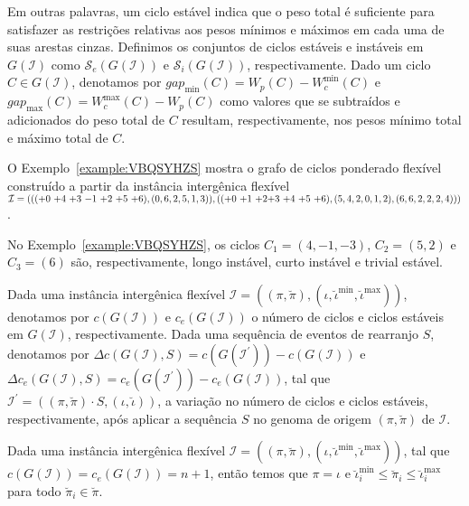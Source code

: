 Em outras palavras, um ciclo estável indica que o peso total é suficiente para satisfazer as restrições relativas aos pesos mínimos e máximos em cada uma de suas arestas cinzas. Definimos os conjuntos de ciclos estáveis e instáveis em $G(\mathcal{I})$ como $\mathcal{S}_e(G(\mathcal{I}))$ e $\mathcal{S}_i(G(\mathcal{I}))$, respectivamente. Dado um ciclo $C \in G(\mathcal{I})$, denotamos por $gap_{\min}(C) = W_p(C) - W^{\min}_c(C)$ e $gap_{\max}(C) = W^{\max}_c(C) - W_p(C)$ como valores que se subtraídos e adicionados do peso total de $C$ resultam, respectivamente, nos pesos mínimo total e máximo total de $C$.

O Exemplo~\ref{example:VBQSYHZS} mostra o grafo de ciclos ponderado flexível construído a partir da instância intergênica flexível $\mathcal{I} = ((({+0}~{+4}~{+3}~{-1}~{+2}~{+5}~{+6}),(0,6,2,5,1,3)),(({+0}~{+1}~{+2}\break{+3}~{+4}~{+5}~{+6}),(5,4,2,0,1,2),(6,6,2,2,2,4)))$.



No Exemplo~\ref{example:VBQSYHZS}, os ciclos $C_1=(4,-1,-3)$, $C_2 = (5,2)$ e $C_3 = (6)$ são, respectivamente, longo instável, curto instável e trivial estável.

Dada uma instância intergênica flexível $\mathcal{I} = ((\pi,\breve\pi),(\iota,\breve\iota^{\min},\breve\iota^{\max}))$, denotamos por $c(G(\mathcal{I}))$ e $c_e(G(\mathcal{I}))$ o número de ciclos e ciclos estáveis em $G(\mathcal{I})$, respectivamente. Dada uma sequência de eventos de rearranjo $S$, denotamos por $\Delta c(G(\mathcal{I}), S) = c(G(\mathcal{I^{\prime}})) - c(G(\mathcal{I}))$ e $\Delta c_e(G(\mathcal{I}), S) = c_e(G(\mathcal{I^{\prime}})) - c_e(G(\mathcal{I}))$, tal que $\mathcal{I^{\prime}} = ((\pi,\breve\pi) \cdot S,(\iota,\breve\iota))$, a variação no número de ciclos e ciclos estáveis, respectivamente, após aplicar a sequência $S$ no genoma de origem $(\pi,\breve\pi)$ de $\mathcal{I}$.

\begin{remark}\label{remark:IRNWKUZA}
Dada uma instância intergênica flexível $\mathcal{I} = ((\pi,\breve\pi),(\iota,\breve\iota^{\min},\breve\iota^{\max}))$, tal que $c(G(\mathcal{I})) = c_e(G(\mathcal{I})) = n+1$, então temos que $\pi = \iota$ e $\breve\iota^{\min}_i \le \breve\pi_i \le \breve\iota^{\max}_i$ para todo $\breve\pi_i \in \breve\pi$.
\end{remark}

